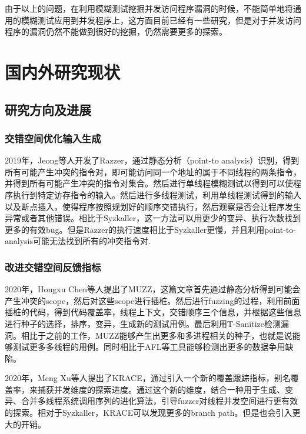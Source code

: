 由于以上的问题，在利用模糊测试挖掘并发访问程序漏洞的时候，不能简单地将通用的模糊测试应用到并发程序上，这方面目前已经有一些研究，但是对于并发访问程序的漏洞仍然不能做到很好的挖掘，仍然需要更多的探索。

\section{国内外研究现状}

\subsection{研究方向及进展}

\subsubsection{交错空间优化输入生成}

2019年，Jeong\cite{jeong2019razzer}等人开发了Razzer，通过静态分析（point-to analysis）识别，得到所有可能产生冲突的指令对，即可能访问同一个地址的属于不同线程的两条指令，并得到所有可能产生冲突的指令对集合。然后进行单线程模糊测试以得到可以使程序执行到特定访存指令的输入。然后进行多线程测试，利用单线程测试得到的输入以及断点插入，使得程序按照规划好的顺序交错执行，然后观察是否会让程序发生异常或者其他错误。相比于Syzkaller，这一方法可以用更少的变异、执行次数找到更多的有效bug。但是Razzer的执行速度相比于Syzkaller更慢，并且利用point-to-analysis可能无法找到所有的冲突指令对.

\subsubsection{改进交错空间反馈指标}

2020年，Hongxu Chen\cite{chen2020muzz}等人提出了MUZZ，这篇文章首先通过静态分析得到可能会产生冲突的scope，然后对这些scope进行插桩。然后进行fuzzing的过程，利用前面插桩的代码，得到代码覆盖率，线程上下文，交错顺序三个信息，并根据这些信息进行种子的选择，排序，变异，生成新的测试用例。最后利用T-Sanitize检测漏洞。相比于之前的工作，MUZZ能够产生出更多和多进程相关的种子，也就是说能够测试更多多线程的用例。同时相比于AFL等工具能够检测出更多的数据争用缺陷。

2020年，Meng Xu\cite{xu2020krace}等人提出了KRACE，通过引入一个新的覆盖跟踪指标，别名覆盖率，来捕获并发维度的探索进度。通过这个新的维度，结合一种用于生成、变异、合并多线程系统调用序列的进化算法，引导fuzzer对线程并发空间进行更有效的探索。相对于Syzkaller，KRACE可以发现更多的branch path。但是也会引入更大的开销。

